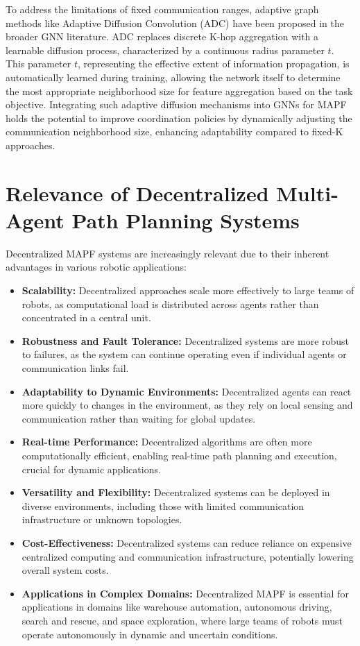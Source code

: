 To address the limitations of fixed communication ranges, adaptive graph methods like Adaptive Diffusion Convolution (ADC) \cite{Zhao2021ADC} have been proposed in the broader GNN literature. ADC replaces discrete K-hop aggregation with a learnable diffusion process, characterized by a continuous radius parameter $t$. This parameter $t$, representing the effective extent of information propagation, is automatically learned during training, allowing the network itself to determine the most appropriate neighborhood size for feature aggregation based on the task objective. Integrating such adaptive diffusion mechanisms into GNNs for MAPF holds the potential to improve coordination policies by dynamically adjusting the communication neighborhood size, enhancing adaptability compared to fixed-K approaches.

\section{Relevance of Decentralized Multi-Agent Path Planning Systems}
Decentralized MAPF systems are increasingly relevant due to their inherent advantages in various robotic applications:
\begin{itemize}
    \item \textbf{Scalability:} Decentralized approaches scale more effectively to large teams of robots, as computational load is distributed across agents rather than concentrated in a central unit.
    \item \textbf{Robustness and Fault Tolerance:} Decentralized systems are more robust to failures, as the system can continue operating even if individual agents or communication links fail.
    \item \textbf{Adaptability to Dynamic Environments:} Decentralized agents can react more quickly to changes in the environment, as they rely on local sensing and communication rather than waiting for global updates.
    \item \textbf{Real-time Performance:} Decentralized algorithms are often more computationally efficient, enabling real-time path planning and execution, crucial for dynamic applications.
    \item \textbf{Versatility and Flexibility:} Decentralized systems can be deployed in diverse environments, including those with limited communication infrastructure or unknown topologies.
    \item \textbf{Cost-Effectiveness:} Decentralized systems can reduce reliance on expensive centralized computing and communication infrastructure, potentially lowering overall system costs.
    \item \textbf{Applications in Complex Domains:} Decentralized MAPF is essential for applications in domains like warehouse automation, autonomous driving, search and rescue, and space exploration, where large teams of robots must operate autonomously in dynamic and uncertain conditions.
\end{itemize}

